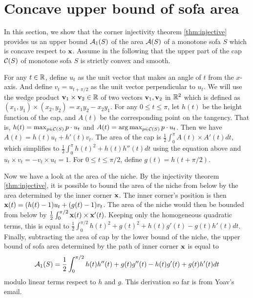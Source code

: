 \section{Concave upper bound of sofa area}

In this section, we show that the corner injectivity theorem \ref{thm:injective} provides us an upper bound $\mathcal{A}_1(S)$ of the area $\mathcal{A}(S)$ of a monotone sofa $S$ which is concave respect to $\mathbf{x}$.
Assume in the following that the upper part of the cap $\mathcal{C}(S)$ of monotone sofa $S$ is strictly convex and smooth.


For any $t \in \mathbb{R}$, define $u_t$ as the unit vector that makes an angle of $t$ from the $x$-axis.
And define $v_t = u_{t + \pi / 2}$ as the unit vector perpendicular to $u_t$.
We will use the wedge product $\mathbf{v}_1 \times \mathbf{v}_2 \in \mathbb{R}$ of two vectors $\mathbf{v}_1, \mathbf{v}_2$ in $\mathbb{R}^2$ which is defined as $(x_1, y_1) \times (x_2, y_2) = x_1 y_2 - x_2 y_1$.
For any $0 \leq t \leq \pi$, let $h(t)$ be the height function of the cap, and $A(t)$ be the corresponding point on the tangency.
That is, $h(t) = \max_{p \in \mathcal{C}(S)} p \cdot u_t$
and $A(t) = \arg \max_{p \in \mathcal{C}(S)} p \cdot u_t$.
Then we have $A(t) = h(t) u_t + h'(t) v_t$.
The area of the cap is $\frac{1}{2} \int_0^{\pi} A(t) \times A'(t) dt$, which simplifies to 
$\frac{1}{2} \int_0^{\pi} h(t)^2 + h(t)h''(t) dt$ using the equation above and $u_t \times v_t = -v_t \times u_t = 1$. 
For $0 \leq t \leq \pi / 2$, define $g(t) = h(t + \pi / 2)$.

Now we have a look at the area of the niche. 
By the injectivity theorem \ref{thm:injective}, it is possible to bound the area of the niche from below by the area determined by the inner corner $\mathbf{x}$.
The inner corner's position is then $\mathbf{x}(t) = (h(t) - 1) u_t + (g(t) - 1) v_t$.
The area of the niche would then be bounded from below by 
$\frac{1}{2} \int_0^{\pi / 2} \mathbf{x}(t) \times \mathbf{x}'(t)$. 
Keeping only the homogeneous quadratic terms, this is equal to
$\frac{1}{2} \int_0^{\pi / 2} h(t)^2+g(t)^2+h(t)g'(t)-g(t)h'(t) dt$.
Finally, subtracting the area of cap by the lower bound of the niche, the upper bound of sofa area determined by the path of inner corner $\mathbf{x}$ is equal to
\begin{equation}
\label{eq:areaub}
\mathcal{A}_1(S) = \frac{1}{2}\int_0^{\pi/2} h(t)h''(t)+g(t)g''(t)-h(t)g'(t)+g(t)h'(t) dt
\end{equation}
modulo linear terms respect to $h$ and $g$. This derivation so far is from Yoav's email. 

